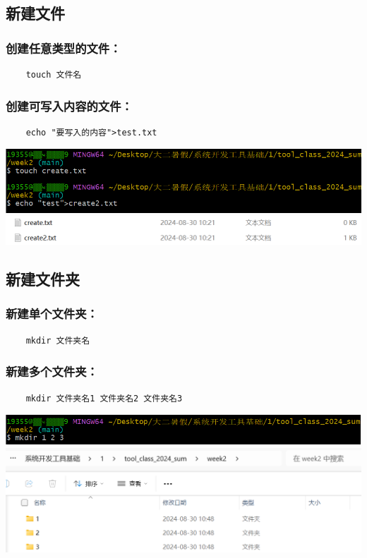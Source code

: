 \documentclass[UTF8,a4paper]{ctexart}
\begin{document}
\subsection{新建文件}
\subsubsection{创建任意类型的文件：}
\begin{lstlisting}
    touch 文件名
\end{lstlisting}

\subsubsection{创建可写入内容的文件：}
\begin{lstlisting}
    echo "要写入的内容">test.txt
\end{lstlisting}
\includegraphics[width=1\textwidth]{create.png}\\
\includegraphics[width=1\textwidth]{create2.png}

\subsection{新建文件夹}
\subsubsection{新建单个文件夹：}
\begin{lstlisting}
    mkdir 文件夹名
\end{lstlisting}
\subsubsection{新建多个文件夹：}
\begin{lstlisting}
    mkdir 文件夹名1 文件夹名2 文件夹名3
\end{lstlisting}
\includegraphics[width=1\textwidth]{./pictures/新建多个.png}\\
\includegraphics[width=1\textwidth]{./pictures/新建多个2.png}
\end{document}
